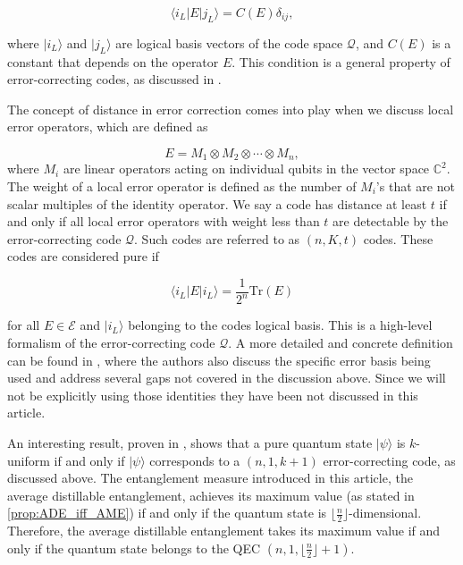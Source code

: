\documentclass{article}
\newcommand{\ket}[1]{|#1\rangle}
\newcommand{\bra}[1]{\langle #1|}
\begin{document}
\begin{equation}
\bra{i_L}E\ket{j_L} = C(E) \delta_{ij},
\end{equation}


where $\ket{i_L}$ and $\ket{j_L}$ are logical basis vectors of the code space $\mathcal{Q}$, and $C(E)$ is a constant that depends on the operator $E$. This condition is a general property of error-correcting codes, as discussed in \cite{Nielsen_Chuang_2010}. 

The concept of distance in error correction comes into play when we discuss local error operators, which are defined as

\begin{equation}
E = M_1 \otimes M_2 \otimes \cdots \otimes M_n,
\end{equation}
where $M_i$ are linear operators acting on individual qubits in the vector space $\mathbb{C}^2$. The weight of a local error operator is defined as the number of $M_i$'s that are not scalar multiples of the identity operator. We say a code has distance at least $t$ if and only if all local error operators with weight less than $t$ are detectable by the error-correcting code $\mathcal{Q}$. Such codes are referred to as $(n, K, t)$ codes. These codes are considered pure if 

\begin{equation}
\bra{i_L}E\ket{i_L} = \frac{1}{2^n} \text{Tr}(E)
\end{equation}

for all $E \in \mathcal{E}$ and $\ket{i_L}$ belonging to the codes logical basis.
This is a high-level formalism of the error-correcting code $\mathcal{Q}$. A more detailed and concrete definition can be found in \cite{Scott_k-uniform}, where the authors also discuss the specific error basis being used and address several gaps not covered in the discussion above. Since we will not be explicitly using those identities they have been not discussed in this article.

An interesting result, proven in \cite{Scott_k-uniform}, shows that a pure quantum state $\ket{\psi}$ is $k$-uniform if and only if $\ket{\psi}$ corresponds to a $(n, 1, k+1)$ error-correcting code, as discussed above. The entanglement measure introduced in this article, the average distillable entanglement, achieves its maximum value (as stated in \ref{prop:ADE_iff_AME}) if and only if the quantum state is $\lfloor \frac{n}{2} \rfloor$-dimensional. Therefore, the average distillable entanglement takes its maximum value if and only if the quantum state belongs to the QEC $(n, 1, \lfloor \frac{n}{2} \rfloor+1)$.
\end{document}
